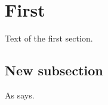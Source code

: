 \documentclass{test-staleaux-ptc-own}
\begin{document}
\section{First}
\startcontents
{}
Text of the first section.
\classtext\ \clotext\ \fourhttext\ \packagetext\ \ \ltxtext\ \fdtext\ \bbxtext\ \cbxtext\ 

\subsection{New subsection}
As \cite{able} says.


\end{document}
